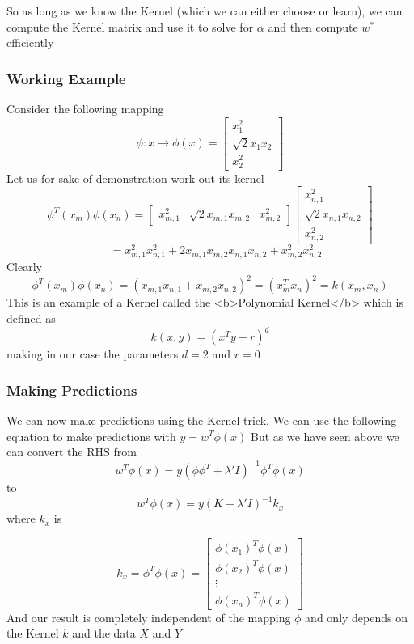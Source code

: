 \documentclass[hidelinks]{book}
\numberwithin{equation}{section}
\begin{document}
So as long as we know the Kernel (which we can either choose or learn), we
can compute the Kernel matrix and use it to solve for $\alpha$ and then
compute $w^*$ efficiently

\subsubsection{Working Example}
Consider the following mapping $$ \phi: x \rightarrow \phi(x) = \begin{bmatrix}
x_1^2 \\ \sqrt{2} x_1 x_2 \\ x_2^2 \end{bmatrix} $$
Let us for sake of demonstration work out its kernel
$$ \phi^T(x_m) \phi(x_n) = \begin{bmatrix} x_{m,1}^2 & \sqrt{2} x_{m,1}
x_{m,2} & x_{m,2}^2 \end{bmatrix} \begin{bmatrix} x_{n,1}^2
\\ \sqrt{2} x_{n,1} x_{n,2} \\ x_{n,2}^2 \end{bmatrix}
$$
$$ \quad = x_{m,1}^2 x_{n,1}^2 + 2 x_{m,1} x_{m,2} x_{n,1} x_{n,2}
+ x_{m,2}^2 x_{n,2}^2 $$
Clearly $$ \phi^T(x_m) \phi(x_n) = (x_{m,1}
x_{n,1} + x_{m,2} x_{n,2})^2 = (x_m^T x_n)^2 = k(x_m, x_n) $$
This is an example of a Kernel called the <b>Polynomial Kernel</b> which is
defined as $$ k(x, y) = (x^T y + r)^d $$ making in our case the parameters
$d = 2$ and $r = 0$

\subsubsection{Making Predictions}
We can now make predictions using the Kernel trick. We can use the following
equation to make predictions with $ y = w^T \phi(x) $ But as we have seen
above we can convert the RHS from
$$ w^T \phi(x) = y(\phi \phi^T + \lambda' I)^{-1} \phi^T \phi(x) $$
to  $$ w^T \phi(x) = y(K + \lambda' I)^{-1} k_x $$ where $k_x$ is

$$ k_x = \phi^T \phi(x) = \begin{bmatrix} \phi(x_1)^T \phi(x) \\ \phi(x_2)^T
\phi(x) \\ \vdots \\ \phi(x_n)^T \phi(x) \end{bmatrix} $$ And our result
is completely independent of the mapping $\phi$ and only depends on the Kernel
$k$ and the data $X$ and $Y$
\end{document}
